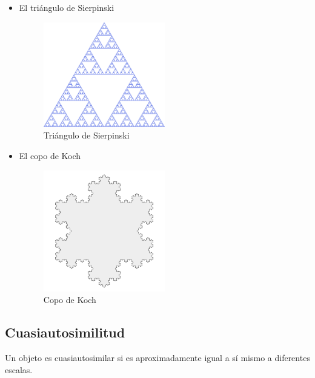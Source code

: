 \begin{itemize}
    \item El triángulo de Sierpinski
    
    \begin{figure}[H]
        \centering
        \includegraphics[width=0.5\textwidth]{figures/sierpinski-triangle.png}
        \caption{Triángulo de Sierpinski}
    \end{figure}

    \item El copo de Koch
    
    \begin{figure}[H]
        \centering
        \includegraphics[width=0.5\textwidth]{figures/koch-snowflake.png}
        \caption{Copo de Koch}
    \end{figure}

\end{itemize}

\subsection{Cuasiautosimilitud}

\begin{definition}
    Un objeto es cuasiautosimilar si es aproximadamente igual a sí mismo a diferentes escalas.
\end{definition}

